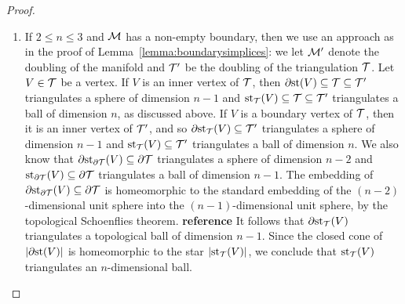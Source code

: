 \documentclass[10pt,a4paper]{article}
\newcommand{\todo}[1]{{\color{RedOrange}\textbf{#1}}}
\begin{document}
\begin{proof}
\begin{enumerate}
    \item 
    If $2 \leq n \leq 3$ and ${\mathcal M}$ has a non-empty boundary, then we use an approach as in the proof of Lemma~\ref{lemma:boundarysimplices}: 
    we let ${\mathcal M}'$ denote the doubling of the manifold and ${\mathcal T}'$ be the doubling of the triangulation ${\mathcal T}$. 
    Let $V \in {\mathcal T}$ be a vertex. 
    If $V$ is an inner vertex of ${\mathcal T}$, then ${\partial \rm st}(V) \subseteq {\mathcal T} \subseteq {\mathcal T}'$ triangulates a sphere of dimension $n-1$ and $\operatorname{st}_{{\mathcal T}}(V) \subseteq {\mathcal T} \subseteq {\mathcal T}'$ triangulates a ball of dimension $n$, as discussed above. 
    If $V$ is a boundary vertex of ${\mathcal T}$, then it is an inner vertex of ${\mathcal T}'$,
    and so ${\partial \rm st}_{{\mathcal T}}(V) \subseteq {\mathcal T}'$ triangulates a sphere of dimension $n-1$ and $\operatorname{st}_{{\mathcal T}}(V) \subseteq {\mathcal T}'$ triangulates a ball of dimension $n$.
    We also know that ${\partial \rm st}_{\partial{\mathcal T}}(V) \subseteq \partial{\mathcal T}$ triangulates a sphere of dimension $n-2$ and $\operatorname{st}_{\partial{\mathcal T}}(V) \subseteq \partial{\mathcal T}$ triangulates a ball of dimension $n-1$. 
    The embedding of ${\partial \rm st}_{\partial{\mathcal T}}(V) \subseteq \partial{\mathcal T}$ is homeomorphic to the standard embedding of the $(n-2)$-dimensional unit sphere into the $(n-1)$-dimensional unit sphere,
    by the topological Schoenflies theorem. \todo{reference}
    It follows that ${\partial \rm st}_{{\mathcal T}}(V)$ triangulates a topological ball of dimension $n-1$.
    Since the closed cone of $\left| {\partial \rm st}(V) \right|$ is homeomorphic to the star $\left| \operatorname{st}_{{\mathcal T}}(V) \right|$, we conclude that $\operatorname{st}_{{\mathcal T}}(V)$ triangulates an $n$-dimensional ball. 
    

\end{enumerate}
\end{proof}
\end{document}
